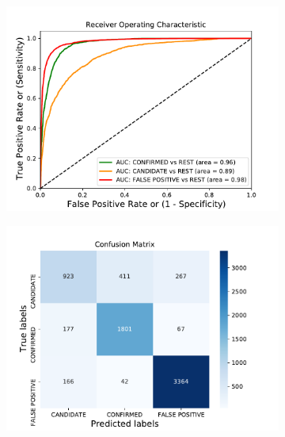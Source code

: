 \begin{figure}[H]
                \centering
                \begin{subfigure}{.49\textwidth}
                \includegraphics[width = 1\textwidth]{data/LR_vif_cap2_overfit_roc.pdf}
                \end{subfigure}
                \begin{subfigure}{.49\textwidth}
                \includegraphics[width = 1\textwidth]{data/LR_vif_cap2_overfit_cm.pdf}
                \end{subfigure}
                \begin{subfigure}{.49\textwidth}

\end{subfigure}
\end{figure}
